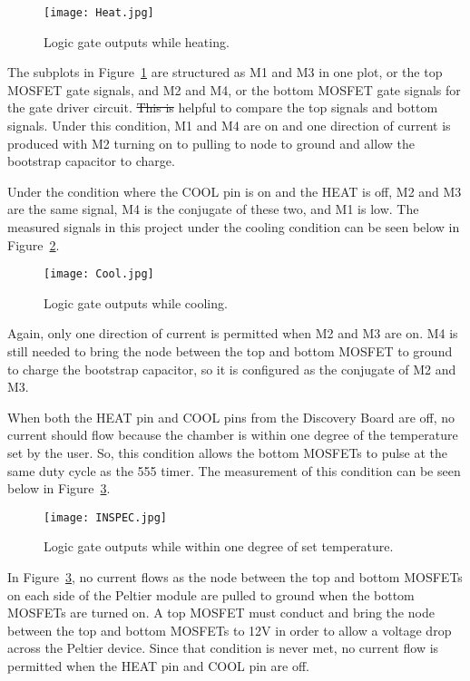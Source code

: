 \documentclass[11pt,letter]{article}
\providecommand{\DIFadd}[1]{{\protect\color{blue}\uwave{#1}}} %
\providecommand{\DIFdel}[1]{{\protect\color{red}\sout{#1}}}                      %
\providecommand{\DIFaddbegin}{} %
\providecommand{\DIFaddend}{} %
\providecommand{\DIFdelbegin}{} %
\providecommand{\DIFdelend}{} %
\providecommand{\DIFaddbeginFL}{} %
\providecommand{\DIFaddendFL}{} %
\providecommand{\DIFdelbeginFL}{} %
\providecommand{\DIFdelendFL}{} %
\newcommand{\DIFscaledelfig}{0.5}
\newlength{\DIFdelgraphicswidth} %
\newlength{\DIFdelgraphicsheight} %
\newcommand{\DIFaddincludegraphics}[2][]{{\color{blue}\fbox{\DIFOincludegraphics[#1]{#2}}}} %
\newcommand{\DIFdelincludegraphics}[2][]{%
\sbox{\DIFdelgraphicsbox}{\DIFOincludegraphics[#1]{#2}}%
\settoboxwidth{\DIFdelgraphicswidth}{\DIFdelgraphicsbox} %
\settoboxtotalheight{\DIFdelgraphicsheight}{\DIFdelgraphicsbox} %
\scalebox{\DIFscaledelfig}{%
\parbox[b]{\DIFdelgraphicswidth}{\usebox{\DIFdelgraphicsbox}\\[-\baselineskip] \rule{\DIFdelgraphicswidth}{0em}}\llap{\resizebox{\DIFdelgraphicswidth}{\DIFdelgraphicsheight}{%
\setlength{\unitlength}{\DIFdelgraphicswidth}%
\begin{picture}(1,1)%
\thicklines\linethickness{2pt} %
{\color[rgb]{1,0,0}\put(0,0){\framebox(1,1){}}}%
{\color[rgb]{1,0,0}\put(0,0){\line( 1,1){1}}}%
{\color[rgb]{1,0,0}\put(0,1){\line(1,-1){1}}}%
\end{picture}%
}\hspace*{3pt}}} %
} %
\DeclareRobustCommand{\DIFaddbegin}{\DIFOaddbegin \let\includegraphics\DIFaddincludegraphics} %
\DeclareRobustCommand{\DIFaddend}{\DIFOaddend \let\includegraphics\DIFOincludegraphics} %
\DeclareRobustCommand{\DIFdelbegin}{\DIFOdelbegin \let\includegraphics\DIFdelincludegraphics} %
\DeclareRobustCommand{\DIFdelend}{\DIFOaddend \let\includegraphics\DIFOincludegraphics} %
\DeclareRobustCommand{\DIFaddbeginFL}{\DIFOaddbeginFL \let\includegraphics\DIFaddincludegraphics} %
\DeclareRobustCommand{\DIFaddendFL}{\DIFOaddendFL \let\includegraphics\DIFOincludegraphics} %
\DeclareRobustCommand{\DIFdelbeginFL}{\DIFOdelbeginFL \let\includegraphics\DIFdelincludegraphics} %
\DeclareRobustCommand{\DIFdelendFL}{\DIFOaddendFL \let\includegraphics\DIFOincludegraphics} %
\begin{document}
\begin{figure}[H]
    \centering
    \DIFdelbeginFL %
\DIFdelendFL \DIFaddbeginFL \texttt{[image: Heat.jpg]}
    \DIFaddendFL \caption{Logic gate outputs while heating.}
    \label{fig:heatLogic}
\end{figure}

The subplots in Figure~\ref{fig:heatLogic} are structured as M1 and M3 in one plot, or the top MOSFET gate signals, and M2 and M4, or the bottom MOSFET gate signals for the gate driver circuit. \DIFdelbegin \DIFdel{This is }\DIFdelend \DIFaddbegin \DIFadd{These plots are }\DIFaddend helpful to compare the top signals and bottom signals. Under this condition, M1 and M4 are on and one direction of current is produced with M2 turning on to pulling to node to ground and allow the bootstrap capacitor to charge.

Under the condition where the COOL pin is on and the HEAT is off, M2 and M3 are the same signal, M4 is the conjugate of these two, and M1 is low. The measured signals in this project under the cooling condition can be seen below in Figure~\ref{fig:coolLogic}.

\begin{figure}[H]
    \centering
    \texttt{[image: Cool.jpg]}
    \caption{Logic gate outputs while cooling.}
    \label{fig:coolLogic}
\end{figure}

Again, only one direction of current is permitted when M2 and M3 are on. M4 is still needed to bring the node between the top and bottom MOSFET to ground to charge the bootstrap capacitor, so it is configured as the conjugate of M2 and M3.

When both the HEAT pin and COOL pins from the Discovery Board are off, no current should flow because the chamber is within one degree of the temperature set by the user. So, this condition allows the bottom MOSFETs to pulse at the same duty cycle as the 555 timer. The measurement of this condition can be seen below in Figure~\ref{fig:inSpecLogic}.

\begin{figure}[H]
    \centering
    \texttt{[image: INSPEC.jpg]}
    \caption{Logic gate outputs while within one degree of set temperature.}
    \label{fig:inSpecLogic}
\end{figure}
In Figure~\ref{fig:inSpecLogic}, no current flows as the node between the top and bottom MOSFETs on each side of the Peltier module are pulled to ground when the bottom MOSFETs are turned on. A top MOSFET must conduct and bring the node between the top and bottom MOSFETs to 12V in order to allow a voltage drop across the Peltier device. Since that condition is never met, no current flow is permitted when the HEAT pin and COOL pin are off.
\end{document}
